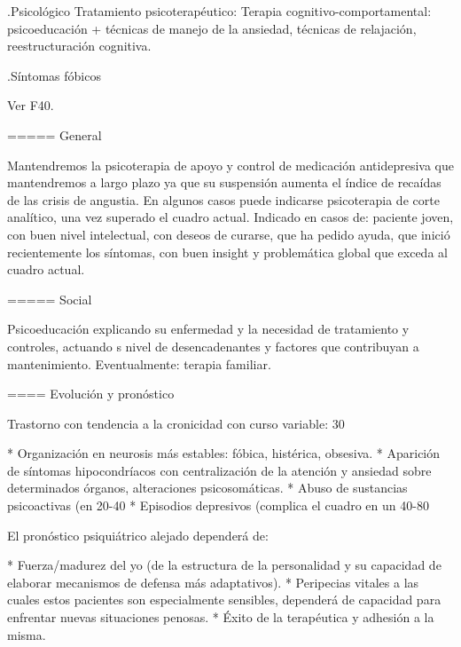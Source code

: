 \documentclass{scrbook}
\begin{document}
.Psicológico
Tratamiento psicoterapéutico: Terapia cognitivo-comportamental: psicoeducación + técnicas de manejo de la ansiedad, técnicas de relajación, reestructuración cognitiva.

.Síntomas fóbicos

Ver F40. 

===== General

Mantendremos la psicoterapia de apoyo y control de medicación antidepresiva que mantendremos a largo plazo ya que su suspensión aumenta el índice de recaídas de las crisis de angustia. En algunos casos puede indicarse psicoterapia de corte analítico, una vez superado el cuadro actual. Indicado en casos de: paciente joven, con buen nivel intelectual, con deseos de curarse, que ha pedido ayuda, que inició recientemente los síntomas, con buen insight y problemática global que exceda al cuadro actual.

===== Social

Psicoeducación explicando su enfermedad y la necesidad de tratamiento y controles, actuando s nivel de desencadenantes y factores que contribuyan a mantenimiento. Eventualmente: terapia familiar.

==== Evolución y pronóstico

Trastorno con tendencia a la cronicidad con curso variable: 30%

* Organización en neurosis más estables: fóbica, histérica, obsesiva.
* Aparición de síntomas hipocondríacos con centralización de la atención y ansiedad sobre determinados órganos, alteraciones psicosomáticas.
* Abuso de sustancias psicoactivas (en 20-40%
* Episodios depresivos (complica el cuadro en un 40-80%

El pronóstico psiquiátrico alejado dependerá de:

* Fuerza/madurez del yo (de la estructura de la personalidad y su capacidad de elaborar mecanismos de defensa más adaptativos).
* Peripecias vitales a las cuales estos pacientes son especialmente sensibles, dependerá de capacidad para enfrentar nuevas situaciones penosas.
* Éxito de la terapéutica y adhesión a la misma.
\end{document}
